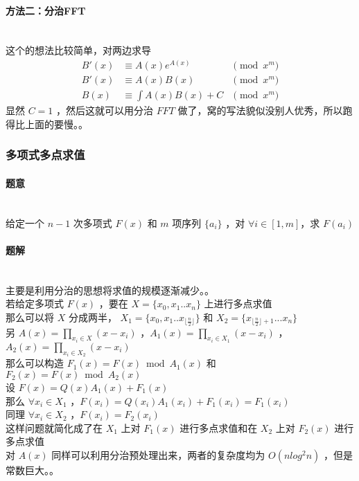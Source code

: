 	\paragraph{方法二：分治FFT}~\\
	这个的想法比较简单，对两边求导
	$$
	\begin{aligned}
	B'(x)&\equiv A(x)e^{A(x)} &\pmod{x^m}\\
	B'(x)&\equiv A(x)B(x)&\pmod{x^m}\\
	B(x)&\equiv \int A(x)B(x)+C&\pmod{x^m}
	\end{aligned}
	$$
	显然 $C=1$ ，然后这就可以用分治 $FFT$ 做了，窝的写法貌似没别人优秀，所以跑得比上面的要慢。。\\
	\vspace{1cm}
	\subsubsection{多项式多点求值}
	\paragraph{题意}~\\
	给定一个 $n-1$ 次多项式 $F(x)$ 和 $m$ 项序列 $\{a_i\}$ ，对 $\forall i\in[1,m]$，求 $F(a_i)$
	\paragraph{题解}~\\
	主要是利用分治的思想将求值的规模逐渐减少。。\\
	若给定多项式 $F(x)$ ，要在 $X=\{x_0,x_1..x_n\}$ 上进行多点求值\\
	那么可以将 $X$ 分成两半， $X_1=\{x_0,x_1..x_{\lfloor\frac{n}{2} \rfloor} \}$ 和 $X_2=\{x_{\lfloor\frac{n}{2} \rfloor+1}...x_n\}$\\
	另 $A(x)=\prod_{x_i\in X} (x-x_i)$ ，$A_1(x)=\prod_{x_i\in X_1} (x-x_i)$ ，$A_2(x)=\prod_{x_i\in X_2} (x-x_i)$\\
	那么可以构造 $F_1(x)=F(x)\bmod{A_1(x)}$ 和 $F_2(x)=F(x)\bmod{A_2(x)}$\\
	设 $F(x)=Q(x)A_1(x)+F_1(x)$\\
	那么 $\forall x_i\in X_1$ ，$F(x_i)=Q(x_i)A_1(x_i)+F_1(x_i)=F_1(x_i)$\\
	同理 $\forall x_i\in X_2$ ，$F(x_i)=F_2(x_i)$\\
	这样问题就简化成了在 $X_1$ 上对 $F_1(x)$ 进行多点求值和在 $X_2$ 上对 $F_2(x)$ 进行多点求值\\
	对 $A(x)$ 同样可以利用分治预处理出来，两者的复杂度均为 $O(nlog^2n)$ ，但是常数巨大。。\\
	\newpage
